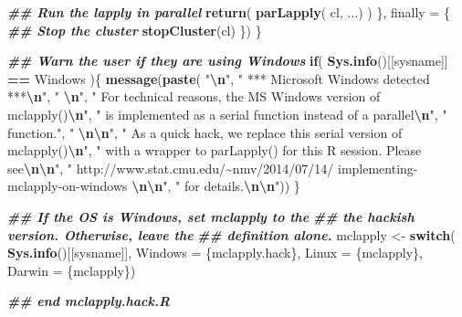 \documentclass[
  12pt,
  american,
  a4paper,
  extrafontsizes,onecolumn,openright
  ]{memoir}
\newenvironment{Shaded}{\begin{snugshade}}{\end{snugshade}}
\newcommand{\AttributeTok}[1]{\textcolor[rgb]{0.13,0.29,0.53}{#1}}
\newcommand{\ControlFlowTok}[1]{\textcolor[rgb]{0.13,0.29,0.53}{\textbf{#1}}}
\newcommand{\DocumentationTok}[1]{\textcolor[rgb]{0.56,0.35,0.01}{\textbf{\textit{#1}}}}
\newcommand{\FunctionTok}[1]{\textcolor[rgb]{0.13,0.29,0.53}{\textbf{#1}}}
\newcommand{\NormalTok}[1]{#1}
\newcommand{\OtherTok}[1]{\textcolor[rgb]{0.56,0.35,0.01}{#1}}
\newcommand{\SpecialCharTok}[1]{\textcolor[rgb]{0.81,0.36,0.00}{\textbf{#1}}}
\newcommand{\StringTok}[1]{\textcolor[rgb]{0.31,0.60,0.02}{#1}}
\begin{document}
\begin{Shaded}
\begin{Highlighting}[]
    \DocumentationTok{\#\# Run the lapply in parallel }
    \FunctionTok{return}\NormalTok{( }\FunctionTok{parLapply}\NormalTok{( cl, ...) )}
\NormalTok{  \}, }\AttributeTok{finally =}\NormalTok{ \{        }
    \DocumentationTok{\#\# Stop the cluster}
    \FunctionTok{stopCluster}\NormalTok{(cl)}
\NormalTok{  \})}
\NormalTok{\}}

\DocumentationTok{\#\# Warn the user if they are using Windows}
\ControlFlowTok{if}\NormalTok{( }\FunctionTok{Sys.info}\NormalTok{()[[}\StringTok{\textquotesingle{}sysname\textquotesingle{}}\NormalTok{]] }\SpecialCharTok{==} \StringTok{\textquotesingle{}Windows\textquotesingle{}}\NormalTok{ )\{}
  \FunctionTok{message}\NormalTok{(}\FunctionTok{paste}\NormalTok{(}
    \StringTok{"}\SpecialCharTok{\textbackslash{}n}\StringTok{"}\NormalTok{, }
    \StringTok{"   *** Microsoft Windows detected ***}\SpecialCharTok{\textbackslash{}n}\StringTok{"}\NormalTok{,}
    \StringTok{"   }\SpecialCharTok{\textbackslash{}n}\StringTok{"}\NormalTok{,}
    \StringTok{"   For technical reasons, the MS Windows version of mclapply()}\SpecialCharTok{\textbackslash{}n}\StringTok{"}\NormalTok{,}
    \StringTok{"   is implemented as a serial function instead of a parallel}\SpecialCharTok{\textbackslash{}n}\StringTok{"}\NormalTok{,}
    \StringTok{"   function."}\NormalTok{,}
    \StringTok{"   }\SpecialCharTok{\textbackslash{}n\textbackslash{}n}\StringTok{"}\NormalTok{,}
    \StringTok{"   As a quick hack, we replace this serial version of mclapply()}\SpecialCharTok{\textbackslash{}n}\StringTok{"}\NormalTok{,}
    \StringTok{"   with a wrapper to parLapply() for this R session. Please see}\SpecialCharTok{\textbackslash{}n\textbackslash{}n}\StringTok{"}\NormalTok{,}
    \StringTok{"     http://www.stat.cmu.edu/\textasciitilde{}nmv/2014/07/14/}
\StringTok{    implementing{-}mclapply{-}on{-}windows }\SpecialCharTok{\textbackslash{}n\textbackslash{}n}\StringTok{"}\NormalTok{,}
    \StringTok{"   for details.}\SpecialCharTok{\textbackslash{}n\textbackslash{}n}\StringTok{"}\NormalTok{))}
\NormalTok{\}}

\DocumentationTok{\#\# If the OS is Windows, set mclapply to the}
\DocumentationTok{\#\# the hackish version. Otherwise, leave the}
\DocumentationTok{\#\# definition alone. }
\NormalTok{mclapply }\OtherTok{\textless{}{-}} \ControlFlowTok{switch}\NormalTok{( }\FunctionTok{Sys.info}\NormalTok{()[[}\StringTok{\textquotesingle{}sysname\textquotesingle{}}\NormalTok{]],}
                    \AttributeTok{Windows =}\NormalTok{ \{mclapply.hack\}, }
                    \AttributeTok{Linux   =}\NormalTok{ \{mclapply\},}
                    \AttributeTok{Darwin  =}\NormalTok{ \{mclapply\})}

\DocumentationTok{\#\# end mclapply.hack.R}
\end{Highlighting}
\end{Shaded}
\end{document}
